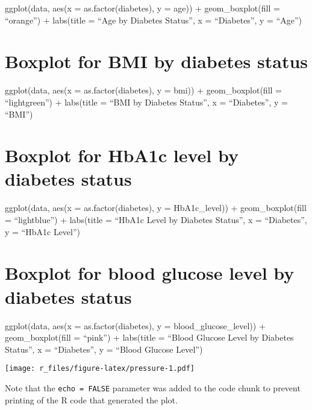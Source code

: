 \documentclass[
]{article}
\begin{document}
ggplot(data, aes(x = as.factor(diabetes), y = age)) + geom\_boxplot(fill
= ``orange'') + labs(title = ``Age by Diabetes Status'', x =
``Diabetes'', y = ``Age'')

\hypertarget{boxplot-for-bmi-by-diabetes-status-1}{%
\section{Boxplot for BMI by diabetes
status}\label{boxplot-for-bmi-by-diabetes-status-1}}

ggplot(data, aes(x = as.factor(diabetes), y = bmi)) + geom\_boxplot(fill
= ``lightgreen'') + labs(title = ``BMI by Diabetes Status'', x =
``Diabetes'', y = ``BMI'')

\hypertarget{boxplot-for-hba1c-level-by-diabetes-status-1}{%
\section{Boxplot for HbA1c level by diabetes
status}\label{boxplot-for-hba1c-level-by-diabetes-status-1}}

ggplot(data, aes(x = as.factor(diabetes), y = HbA1c\_level)) +
geom\_boxplot(fill = ``lightblue'') + labs(title = ``HbA1c Level by
Diabetes Status'', x = ``Diabetes'', y = ``HbA1c Level'')

\hypertarget{boxplot-for-blood-glucose-level-by-diabetes-status-1}{%
\section{Boxplot for blood glucose level by diabetes
status}\label{boxplot-for-blood-glucose-level-by-diabetes-status-1}}

ggplot(data, aes(x = as.factor(diabetes), y = blood\_glucose\_level)) +
geom\_boxplot(fill = ``pink'') + labs(title = ``Blood Glucose Level by
Diabetes Status'', x = ``Diabetes'', y = ``Blood Glucose Level'')

\texttt{[image: r\_files/figure-latex/pressure-1.pdf]}

Note that the \texttt{echo\ =\ FALSE} parameter was added to the code
chunk to prevent printing of the R code that generated the plot.
\end{document}

